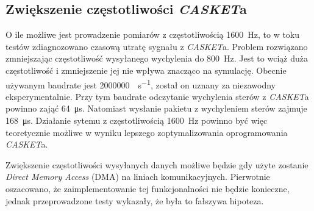 \subsection{Zwiększenie częstotliwości \textit{CASKET}a}
\label{subsec:rozwoj-zwiekszzenie-czestotliwosci}
O ile możliwe jest prowadzenie pomiarów z częstotliwością \SI{1600}{\hertz},
to w toku testów zdiagnozowano czasową utratę sygnału z \textit{CASKET}a.
Problem rozwiązano zmniejszając częstotliwość wysyłanego wychylenia 
do \SI{800}{\hertz}. Jest to wciąż duża częstotliwość i zmniejszenie
jej nie wpływa znacząco na symulację.
Obecnie używanym baudrate jest \SI{2000000}{\bit\per\second}, został on uznany za 
niezawodny eksperymentalnie. Przy tym baudrate odczytanie wychylenia sterów z \textit{CASKET}a
powinno zająć \SI{64}{\micro\second}. Natomiast wysłanie pakietu z wychyleniem sterów zajmuje \SI{168}{\micro\second}.
Działanie sytemu z częstotliwością \SI{1600}{\hertz} powinno być więc teoretycznie możliwe w wyniku lepszego zoptymalizowania oprogramowania \textit{CASKET}a.

Zwiększenie częstotliwości wysyłanych danych możliwe będzie 
gdy użyte zostanie \textit{Direct Memory Access} (DMA) na liniach komunikacyjnych.
Pierwotnie oszacowano, że zaimplementowanie tej funkcjonalności nie
będzie konieczne, jednak przeprowadzone testy wykazały, że była to fałszywa hipoteza.
